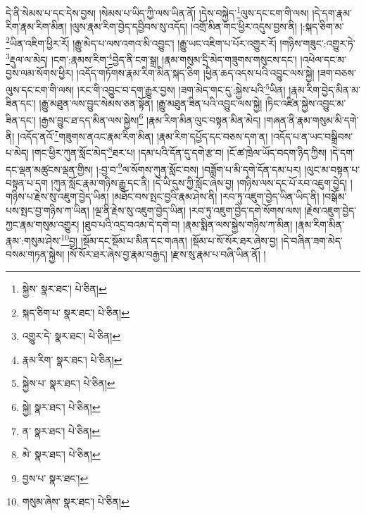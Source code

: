 དེ་ནི་སེམས་པ་དང་དེས་བྱས། །སེམས་པ་ཡིད་ཀྱི་ལས་ཡིན་ནོ། །དེས་བསྐྱེད་\footnote{སྐྱེས་  སྣར་ཐང་།  པེ་ཅིན། }ལུས་དང་ངག་གི་ལས། །དེ་དག་རྣམ་རིག་རྣམ་རིག་མིན། །ལུས་རྣམ་རིག་བྱེད་དབྱིབས་སུ་འདོད། །འགྲོ་མིན་གང་ཕྱིར་འདུས་བྱས་ནི། །:སྐད་ཅིག་མ་\footnote{སྐད་ཅིག་པ་  སྣར་ཐང་།  པེ་ཅིན། }ཡིན་འཇིག་ཕྱིར་རོ། །རྒྱུ་མེད་པ་ལས་འགའ་མི་འབྱུང་། །རྒྱུ་ཡང་འཇིག་པ་པོར་འགྱུར་རོ། །གཉིས་གཟུང་:འགྱུར་ཏེ་\footnote{འགྱུར་དེ་  སྣར་ཐང་།  པེ་ཅིན། }རྡུལ་ལ་མེད། །ངག་:རྣམས་རིག་\footnote{རྣམ་རིག་  སྣར་ཐང་།  པེ་ཅིན། }བྱེད་ནི་ངག་སྒྲ། །རྣམ་གསུམ་དྲི་མེད་གཟུགས་གསུངས་དང་། །འཕེལ་དང་མ་བྱས་ལམ་སོགས་ཕྱིར། །འདོད་གཏོགས་རྣམ་རིག་མིན་སྐད་ཅིག །ཕྱིན་ཆད་འདས་པའི་འབྱུང་ལས་སྐྱེ། །ཟག་བཅས་ལུས་དང་ངག་གི་ལས། །རང་གི་འབྱུང་བ་དག་རྒྱུར་བྱས། །ཟག་མེད་གང་དུ་:སྐྱེས་པའི་\footnote{སྐྱེས་པ་  སྣར་ཐང་།  པེ་ཅིན། }ཡིན། །རྣམ་རིག་བྱེད་མིན་མ་ཟིན་དང་། །རྒྱུ་མཐུན་ལས་བྱུང་སེམས་ཅན་སྟོན། །རྒྱུ་མཐུན་ཟིན་པའི་འབྱུང་ལས་སྐྱེ། །ཏིང་འཛིན་སྐྱེས་འབྱུང་མ་ཟིན་དང་། །རྒྱས་བྱུང་ཐ་དད་མིན་ལས་སྐྱེས།\footnote{སྐྱེ།  སྣར་ཐང་།  པེ་ཅིན། } །རྣམ་རིག་མིན་ལུང་བསྟན་མིན་མེད། །གཞན་ནི་རྣམ་གསུམ་མི་དགེ་ནི། །འདོད་ནའོ་\footnote{ན་  སྣར་ཐང་།  པེ་ཅིན། }གཟུགས་ནའང་རྣམ་རིག་མིན། །རྣམ་རིག་དཔྱོད་དང་བཅས་དག་ན། །འདོད་པ་ན་ཡང་བསྒྲིབས་པ་མེད། །གང་ཕྱིར་ཀུན་སློང་མེད་\footnote{མེ་  སྣར་ཐང་།  པེ་ཅིན། }ཐར་པ། །དམ་པའི་དོན་དུ་དགེ་རྩ་བ། །ངོ་ཚ་ཁྲེལ་ཡོད་བདག་ཉིད་ཀྱིས། །དེ་དག་དང་ལྡན་མཚུངས་ལྡན་གྱིས། །:བྱ་བ་\footnote{བྱས་པ་  སྣར་ཐང་། }ལ་སོགས་ཀུན་སློང་བས། །བཟློག་པ་མི་དགེ་དོན་དམ་པར། །ལུང་མ་བསྟན་པ་བསྟན་པ་དག །ཀུན་སློང་རྣམ་གཉིས་རྒྱུ་དང་ནི། །དེ་ཡི་དུས་ཀྱི་སློང་ཞེས་བྱ། །གཉིས་ལས་དང་པོ་རབ་འཇུག་བྱེད། །གཉིས་པ་རྗེས་སུ་འཇུག་བྱེད་ཡིན། །མཐོང་བས་སྤང་བྱའི་རྣམ་ཤེས་ནི། །རབ་ཏུ་འཇུག་བྱེད་ཡིན་ཡིད་ནི། །བསྒོམ་པས་སྤང་བྱ་གཉིས་ཀ་ཡིན། །ལྔ་ནི་རྗེས་སུ་འཇུག་བྱེད་ཡིན། །རབ་ཏུ་འཇུག་བྱེད་དགེ་སོགས་ལས། །རྗེས་འཇུག་བྱེད་ཀྱང་རྣམ་གསུམ་འགྱུར། །ཐུབ་པའི་འདྲ་བའམ་དེ་དགེ་བ། །རྣམ་སྨིན་ལས་སྐྱེས་གཉིས་ཀ་མིན། །རྣམ་རིག་མིན་རྣམ་:གསུམ་ཤེས་\footnote{གསུམ་ཞེས་  སྣར་ཐང་།  པེ་ཅིན། }བྱ། །སྡོམ་དང་སྡོམ་པ་མིན་དང་གཞན། །སྡོམ་པ་སོ་སོར་ཐར་ཞེས་བྱ། །དེ་བཞིན་ཟག་མེད་བསམ་གཏན་སྐྱེས། །སོ་སོར་ཐར་ཞེས་བྱ་རྣམ་བརྒྱད། །རྫས་སུ་རྣམ་པ་བཞི་ཡིན་ནོ། །
